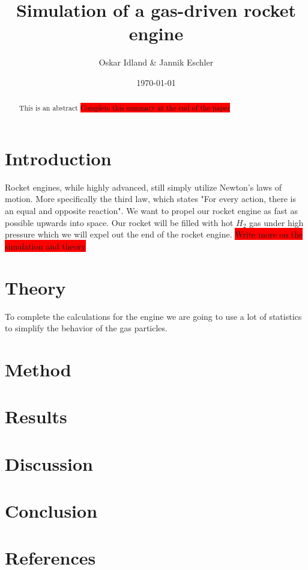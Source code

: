 \documentclass[reprint,english,notitlepage]{revtex4-2}
\begin{document}
\title{Simulation of a gas-driven rocket engine}
\author{Oskar Idland \& Jannik Eschler}
\date{\today}

\begin{abstract}
This is an abstract \colorbox{red}{Complete this summary at the end of the paper}
\end{abstract}
\maketitle

\section{Introduction}
	Rocket engines, while highly advanced, still simply utilize Newton's laws of motion. More specifically the third law, which states "For every action, there is an equal and opposite reaction". We want to propel our rocket engine as fast as possible upwards into space. Our rocket will be filled with hot $ H_2 $ gas under high pressure which we will expel out the end of the rocket engine. \colorbox{red}{Write more on the simulation and theory} 
\section{Theory}
To complete the calculations for the engine we are going to use a lot of statistics to simplify the behavior of the gas particles. 
\section{Method}
\section{Results}
\section{Discussion}
\section{Conclusion}
\section{References}
\end{document}
